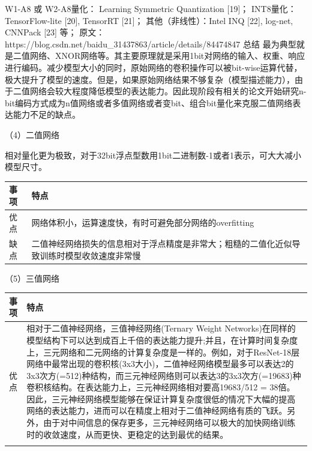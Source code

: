 W1-A8 或 W2-A8量化： Learning Symmetric Quantization {[}19{]}；
INT8量化：TensorFlow-lite {[}20{]}, TensorRT {[}21{]}；
其他（非线性）：Intel INQ {[}22{]}, log-net, CNNPack {[}23{]} 等；
原文：https://blog.csdn.net/baidu\_31437863/article/details/84474847
\textbar{} \textbar{} 总结 \textbar{}
最为典型就是二值网络、XNOR网络等。其主要原理就是采用1bit对网络的输入、权重、响应进行编码。减少模型大小的同时，原始网络的卷积操作可以被bit-wise运算代替，极大提升了模型的速度。但是，如果原始网络结果不够复杂（模型描述能力），由于二值网络会较大程度降低模型的表达能力。因此现阶段有相关的论文开始研究n-bit编码方式成为n值网络或者多值网络或者变bit、组合bit量化来克服二值网络表达能力不足的缺点。
\textbar{}

（4）二值网络

​
相对量化更为极致，对于32bit浮点型数用1bit二进制数-1或者1表示，可大大减小模型尺寸。

\begin{longtable}[]{ ll }
\toprule
事项 & 特点\tabularnewline
\midrule
\endhead
优点 &
网络体积小，运算速度快，有时可避免部分网络的overfitting\tabularnewline
缺点 &
二值神经网络损失的信息相对于浮点精度是非常大；粗糙的二值化近似导致训练时模型收敛速度非常慢\tabularnewline
\bottomrule
\end{longtable}

（5）三值网络

\begin{longtable}[]{ ll }
\toprule
\begin{minipage}[b]{0.07\columnwidth}\raggedright\strut
事项\strut
\end{minipage} & \begin{minipage}[b]{0.80\columnwidth}\raggedright\strut
特点\strut
\end{minipage}\tabularnewline
\midrule
\endhead
\begin{minipage}[t]{0.07\columnwidth}\raggedright\strut
优点\strut
\end{minipage} & \begin{minipage}[t]{0.80\columnwidth}\raggedright\strut
相对于二值神经网络，三值神经网络(Ternary Weight
Networks)在同样的模型结构下可以达到成百上千倍的表达能力提升;并且，在计算时间复杂度上，三元网络和二元网络的计算复杂度是一样的。例如，对于ResNet-18层网络中最常出现的卷积核(3x3大小)，二值神经网络模型最多可以表达2的3x3次方(=512)种结构，而三元神经网络则可以表达3的3x3次方(=19683)种卷积核结构。在表达能力上，三元神经网络相对要高19683/512
=
38倍。因此，三元神经网络模型能够在保证计算复杂度很低的情况下大幅的提高网络的表达能力，进而可以在精度上相对于二值神经网络有质的飞跃。另外，由于对中间信息的保存更多，三元神经网络可以极大的加快网络训练时的收敛速度，从而更快、更稳定的达到最优的结果。\strut
\end{minipage}\tabularnewline
\begin{minipage}[t]{0.07\columnwidth}\raggedright\strut
\strut
\end{minipage} & \begin{minipage}[t]{0.80\columnwidth}\raggedright\strut
\strut
\end{minipage}\tabularnewline
\bottomrule
\end{longtable}


